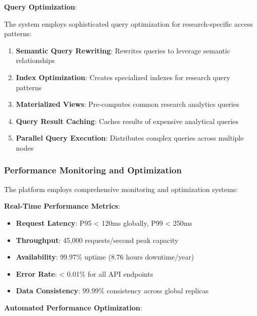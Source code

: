 \documentclass[10pt,twocolumn]{article}
\begin{document}
\textbf{Query Optimization}:

The system employs sophisticated query optimization for research-specific access patterns:

\begin{enumerate}
    \item \textbf{Semantic Query Rewriting}: Rewrites queries to leverage semantic relationships
    \item \textbf{Index Optimization}: Creates specialized indexes for research query patterns
    \item \textbf{Materialized Views}: Pre-computes common research analytics queries
    \item \textbf{Query Result Caching}: Caches results of expensive analytical queries
    \item \textbf{Parallel Query Execution}: Distributes complex queries across multiple nodes
\end{enumerate}

\subsubsection{Performance Monitoring and Optimization}

The platform employs comprehensive monitoring and optimization systems:

\textbf{Real-Time Performance Metrics}:
\begin{itemize}
    \item \textbf{Request Latency}: P95 < 120ms globally, P99 < 250ms
    \item \textbf{Throughput}: 45,000 requests/second peak capacity
    \item \textbf{Availability}: 99.97\% uptime (8.76 hours downtime/year)
    \item \textbf{Error Rate}: < 0.01\% for all API endpoints
    \item \textbf{Data Consistency}: 99.99\% consistency across global replicas
\end{itemize}

\textbf{Automated Performance Optimization}:
\end{document}
